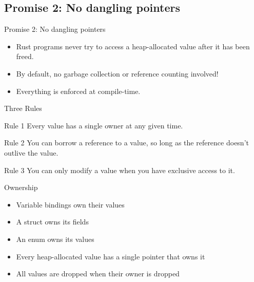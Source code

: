 \subsection{Promise 2: No dangling pointers}


\begin{frame}{Promise 2: No dangling pointers}

\begin{itemize}
	\item Rust programs never try to access a heap-allocated value after it has
		been freed.
	\item By default, no garbage collection or reference counting involved!
	\item Everything is enforced at compile-time.
\end{itemize}

\end{frame}


\begin{frame}{Three Rules}

\begin{block}{Rule 1}
Every value has a single owner at any given time.
\end{block}
\pause
\begin{block}{Rule 2}
You can borrow a reference to a value, so long as the
reference doesn’t outlive the value.
\end{block}
\pause
\begin{block}{Rule 3}
You can only modify a value when you have exclusive
access to it.
\end{block}

\end{frame}


\begin{frame}{Ownership}

\begin{itemize}
	\item Variable bindings own their values
	\item A struct owns its fields
	\item An enum owns its values
	\item Every heap-allocated value has a single pointer that owns it
	\item All values are dropped when their owner is dropped
\end{itemize}

\end{frame}

